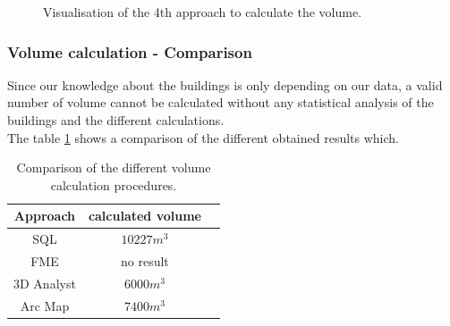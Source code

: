 \begin{figure}[h]
	\caption{Visualisation of the 4th approach to calculate the volume.}
	\label{fig:arcmap_raster}
\end{figure}

\subsubsection{Volume calculation - Comparison}
Since our knowledge about the buildings is only depending on our data, a valid number of volume cannot be calculated without any statistical analysis of the buildings and the different calculations.\\
The table \ref{table:comparison_volume} shows a comparison of the different obtained results which.
\begin{table}[b]
\centering
\begin{tabular}{c  c  c}
Approach & calculated volume\\
\hline						
SQL & $10227m^3$\\
FME & no result\\
3D Analyst & $6000m^3$\\
Arc Map & $7400m^3$\\
\end{tabular}
\caption{Comparison of the different volume calculation procedures.} 
\label{table:comparison_volume}
\end{table}
